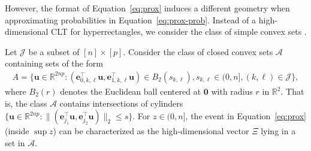 \documentclass[10pt]{article}
\def\be{\mathbf{e}}
\def\bu{\mathbf{u}}
\def\reals{\mathbb{R}}
\theoremstyle{definition}
\theoremstyle{remark}
\begin{document}
However, the format of Equation~\eqref{eq:prox} induces a different geometry when approximating probabilities in Equation~\eqref{eq:prox-prob}. Instead of a high-dimensional CLT for hyperrectangles, we consider the class of simple convex sets \cite[Section 3.1]{chernozhukov2017central}.


Let $\mathcal{J}$ be a subset of $[n] \times [p]$. Consider the class of closed convex sets $\mathcal{A}$ containing sets of the form
\begin{align}\label{eq:clt-sets}
    A = \{\bu \in \reals^{2 n p}: (\be_{0,k,\ell}^\top \bu, \be_{1,k,\ell}^\top \bu) \in B_2(s_{k,\ell}), s_{k,\ell} \in (0,n], (k, \ell) \in \mathcal{J}\},
\end{align}
where $B_2(r)$ denotes the Euclidean ball centered at $\mathbf{0}$ with radius $r$ in $\reals^2$. That is, the class $\mathcal{A}$ contains intersections of cylinders $\{\bu \in \reals^{2np}: \lVert {(\be_{j_1}^\top \bu, \be_{j_2}^\top \bu)} \rVert_2 \leq s\}$. For $z \in (0, n]$, the event in Equation~\eqref{eq:prox} (inside $\sup z$) can be characterized as the high-dimensional vector $\Xi$ lying in a set in $\mathcal{A}$.
\end{document}
